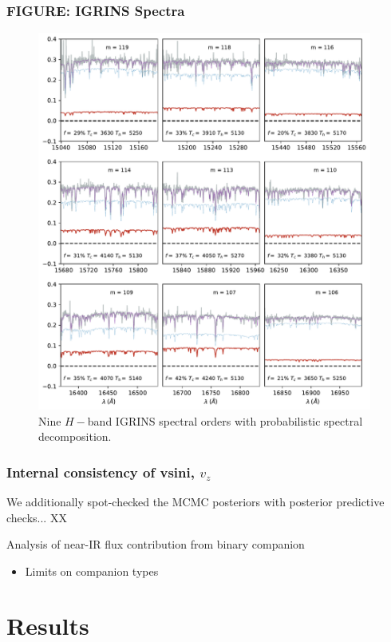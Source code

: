 \documentclass[twocolumn]{emulateapj}%
\begin{document}
\subsubsection{FIGURE: IGRINS Spectra}
\begin{figure}
 \centering
 \includegraphics[width=0.98\textwidth]{figures/H_band_spectra_3x3.pdf}
 \caption{Nine $H-$band IGRINS spectral orders with probabilistic spectral decomposition.}
 \label{fig:IGRINS_spectra3x3}
\end{figure}

\subsubsection{Internal consistency of vsini, $v_z$}
We additionally spot-checked the MCMC posteriors with posterior predictive checks... XX

\item Analysis of near-IR flux contribution from binary companion
\begin{itemize}
  \item Limits on companion types
\end{itemize}


\section{Results}
\end{document}
